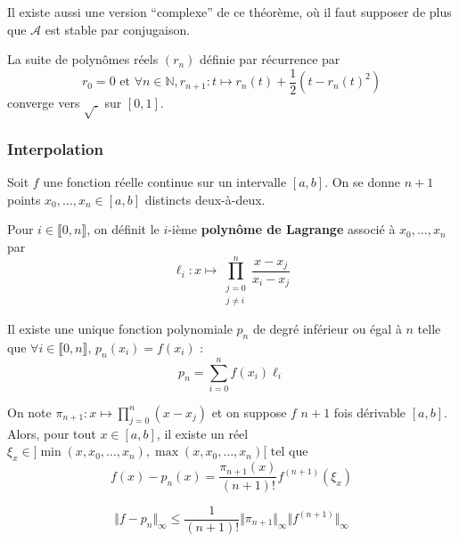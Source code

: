   \begin{remark}
    Il existe aussi une version ``complexe'' de ce théorème, où il faut supposer de plus que $\mathcal{A}$ est stable par conjugaison.
  \end{remark}

  \begin{example}
    La suite de polynômes réels $(r_n)$ définie par récurrence par
    \[ r_0 = 0 \text{ et } \forall n \in \mathbb{N}, r_{n+1} : t \mapsto r_n(t) + \frac{1}{2} (t - r_n(t)^2) \]
    converge vers $\sqrt{.}$ sur $[0,1]$.
  \end{example}

  \subsubsection{Interpolation}


  Soit $f$ une fonction réelle continue sur un intervalle $[a,b]$. On se donne $n+1$ points $x_0, \dots, x_n \in [a,b]$ distincts deux-à-deux.

  \begin{definition}
    Pour $i \in \llbracket 0, n \rrbracket$, on définit le $i$-ième \textbf{polynôme de Lagrange} associé à $x_0, \dots, x_n$ par
    \[ \ell_i : x \mapsto \prod_{\substack{j=0\\j \neq i}}^n \frac{x-x_j}{x_i-x_j} \]
  \end{definition}

  \begin{theorem}
    Il existe une unique fonction polynomiale $p_n$ de degré inférieur ou égal à $n$ telle que $\forall i \in \llbracket 0, n \rrbracket, \, p_n(x_i) = f(x_i)$ :
    \[ p_n = \sum_{i=0}^n f(x_i) \ell_i \]
  \end{theorem}

  \begin{theorem}
    On note $\pi_{n+1} : x \mapsto \prod_{j=0}^{n} (x-x_j)$ et on suppose $f$ $n+1$ fois dérivable $[a,b]$. Alors, pour tout $x \in [a,b]$, il existe un réel $\xi_x \in ]\min(x,x_0,\dots,x_n),\max(x,x_0,\dots,x_n)[$ tel que
    \[ f(x)-p_n(x) = \frac{\pi_{n+1}(x)}{(n+1)!} f^{(n+1)}(\xi_x) \]
  \end{theorem}

  \begin{corollary}
    \[ \Vert f - p_n \Vert_\infty \leq \frac{1}{(n+1)!} \Vert \pi_{n+1} \Vert_\infty \Vert f^{(n+1)} \Vert_\infty \]
  \end{corollary}

